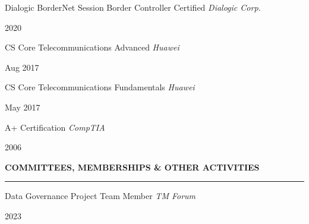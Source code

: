 \documentclass[
  letterpaper,
  DIV=11,
  numbers=noendperiod]{scrartcl}
\begin{document}
\begin{large}
  \begin{multicols}{2}
    \begin{flushleft}
      Dialogic BorderNet Session Border Controller Certified
      \textit{Dialogic Corp.}
    \end{flushleft}
    \begin{flushright}2020\end{flushright}
  \end{multicols}
\end{large}

\begin{large}
  \begin{multicols}{2}
    \begin{flushleft}
      CS Core Telecommunications Advanced
      \textit{Huawei}
    \end{flushleft}
    \begin{flushright}Aug 2017\end{flushright}
  \end{multicols}
\end{large}

\begin{large}
  \begin{multicols}{2}
    \begin{flushleft}
      CS Core Telecommunications Fundamentals
      \textit{Huawei}
    \end{flushleft}
    \begin{flushright}May 2017\end{flushright}
  \end{multicols}
\end{large}

\begin{large}
  \begin{multicols}{2}
    \begin{flushleft}
      A+ Certification
      \textit{CompTIA}
    \end{flushleft}
    \begin{flushright}2006\end{flushright}
  \end{multicols}
\end{large}

\vspace{7pt}

\setlength{\columnsep}{-15.5cm}

\begin{large}
{\bf COMMITTEES, MEMBERSHIPS \& OTHER ACTIVITIES}
  \vspace{3pt}
  \hrule
  \begin{multicols}{2}
    \begin{flushleft}
      Data Governance Project Team Member
      \textit{TM Forum}
      \end{flushleft}
    \begin{flushright}2023\end{flushright}
  \end{multicols}
\end{large}
\end{document}
